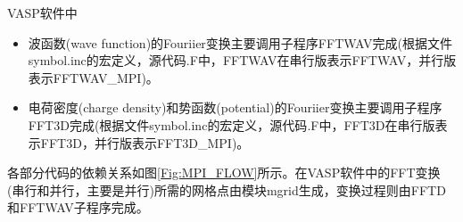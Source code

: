 \maketitle
\textrm{VASP}软件中
\begin{itemize}
	\item 波函数(\textrm{wave function})的\textrm{Fouriier}变换主要调用子程序\textrm{FFTWAV}完成(根据文件\textrm{symbol.inc}的宏定义，源代码\textrm{.F}中，\textrm{FFTWAV}在串行版表示\textrm{FFTWAV}，并行版表示\textrm{FFTWAV\_MPI})。
	\item 电荷密度(\textrm{charge density})和势函数(\textrm{potential})的\textrm{Fouriier}变换主要调用子程序\textrm{FFT3D}完成(根据文件\textrm{symbol.inc}的宏定义，源代码\textrm{.F}中，\textrm{FFT3D}在串行版表示\textrm{FFT3D}，并行版表示\textrm{FFT3D\_MPI})。
\end{itemize}
各部分代码的依赖关系如图\ref{Fig:MPI_FLOW}所示。在\textrm{VASP}软件中的\textrm{FFT}变换(串行和并行，主要是并行)所需的网格点由模块\textrm{mgrid}生成，变换过程则由\textrm{FFTD}和\textrm{FFTWAV}子程序完成。

